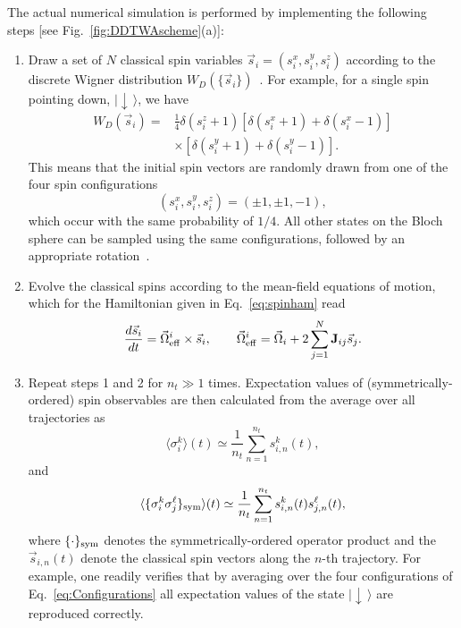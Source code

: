 \documentclass[pra,twocolumn,showpacs,preprintnumbers,amsmath,amssymb,superscriptaddress]{revtex4-1}
\newcommand{\erw}[1]{\langle#1\rangle}
\begin{document}
 The actual numerical simulation is performed by implementing the following steps [see Fig.~\ref{fig:DDTWAscheme}(a)]:
\begin{enumerate}
	\item Draw a set of $N$ classical spin variables $\vec s_i=(s_i^{x}, s_i^{y}, s_i^{z})$ according to the discrete Wigner distribution $W_{D}(\{ \vec s_i \})$~\cite{Wooters1987}. 
	For example, for a single spin pointing down, $|\downarrow\,\rangle$, we have~\cite{Pinero2017} 
	\begin{equation}
	\begin{split}
	W_{D}(\vec s_i)=&\frac{1}{4} \delta(s^z_i+1) \left[\delta(s_i^x+1)+\delta(s_i^x-1)  \right] \\  
	& \times \left[\delta(s^y_i+1)+\delta(s^y_i-1)\right].
	\end{split}
	\end{equation}
	This means that the initial spin vectors are randomly drawn from one of the four spin configurations
	\begin{equation}\label{eq:Configurations}
	(s_i^x,s_i^y,s_i^z)=(\pm 1,\pm 1,-1),
	\end{equation}
	which occur with the same probability of $1/4$. All other states on the Bloch sphere can be sampled using the same configurations, followed by an appropriate rotation~\cite{Pinero2017}. 
	
	
	\item Evolve the classical spins according to the mean-field equations of motion, which for the Hamiltonian given in Eq.~\eqref{eq:spinham} read
	\begin{equation}
	\frac{d\vec s_i}{dt}= \vec \Omega_{\rm eff}^i \times \vec s_i, \qquad \vec \Omega_{\rm eff}^i= \vec \Omega_i +  2 \sum_{j=1}^N {\bf J}_{ij} \vec s_j.
	\label{eq:MF}
	\end{equation}
	
	\item Repeat steps 1 and 2  for $n_t \gg1$ times. Expectation values of (symmetrically-ordered) spin observables are then calculated from the average over all trajectories as
	\begin{equation}
	\erw{\sigma_i^k}(t)  \simeq  \frac{1}{n_t} \sum_{n=1}^{n_t} s_{i,n}^k(t),
	\end{equation}
	and
	\begin{equation}
	\erw{\{\sigma_i^k\sigma_j^\ell\}_{\rm sym}}(t)  \simeq  \frac{1}{n_t} \sum_{n=1}^{n_t} s_{i,n}^k(t) s_{j,n}^\ell(t),
	\end{equation}
        where $\{\cdot \}_{\rm sym}$ denotes the symmetrically-ordered operator product and the $ \vec s_{i,n}(t)$ denote the classical spin vectors along the $n$-th trajectory. For example, one readily verifies  that by averaging over the four configurations of Eq.~\eqref{eq:Configurations} all expectation values of the state  $|\downarrow\,\rangle$ are reproduced correctly.
        
\end{enumerate}
\end{document}
